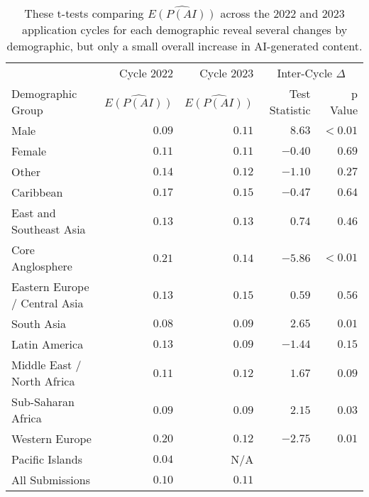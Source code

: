 \begin{table*}[htbp]
  \centering
  \caption{These t-tests comparing $\widehat{E(P(AI))}$ across the 2022 and 2023 application cycles for each demographic reveal several changes by demographic, but only a small overall increase in AI-generated content.}
  \label{tab:demo_means_c23}
  \begin{tabular}{l r r r r}
      \toprule
      & Cycle 2022 & Cycle 2023 & \multicolumn{2}{c}{Inter-Cycle $\Delta$} \\
      Demographic Group & $\widehat{E(P(AI))}$ & $\widehat{E(P(AI))}$ & Test Statistic & p Value \\
      \midrule
      Male    & $0.09$ & $0.11$ & $\mathbf{8.63}$ & $\mathbf{<0.01}$ \\
      Female  & $0.11$ & $0.11$ & $-0.40$ & $0.69$ \\
      Other   & $0.14$ & $0.12$ & $-1.10$ & $0.27$ \\
      \midrule
      Caribbean               & $0.17$ & $0.15$ & $-0.47$ & $0.64$ \\
      East and Southeast Asia     & $0.13$ & $0.13$ & $0.74$ & $0.46$ \\
      Core Anglosphere               & $0.21$ & $0.14$ & $\mathbf{-5.86}$ & $\mathbf{<0.01}$ \\
      Eastern Europe / Central Asia     & $0.13$ & $0.15$ & $0.59$ & $0.56$ \\
      South Asia     & $0.08$ & $0.09$ & $\mathbf{2.65}$ & $\mathbf{0.01}$ \\
      Latin America           & $0.13$ & $0.09$ & $-1.44$ & $0.15$ \\
      Middle East / North Africa   & $0.11$ & $0.12$ & $1.67$ & $0.09$ \\
      Sub-Saharan Africa      & $0.09$ & $0.09$ & $\mathbf{2.15}$ & $\mathbf{0.03}$ \\
      Western Europe            & $0.20$ & $0.12$ & $\mathbf{-2.75}$ & $\mathbf{0.01}$ \\
      Pacific Islands         & $0.04$ & N/A      &  &  \\
      \midrule
      All Submissions         &$0.10$ & $0.11$ &  &  \\
      \bottomrule
  \end{tabular}
\end{table*}

